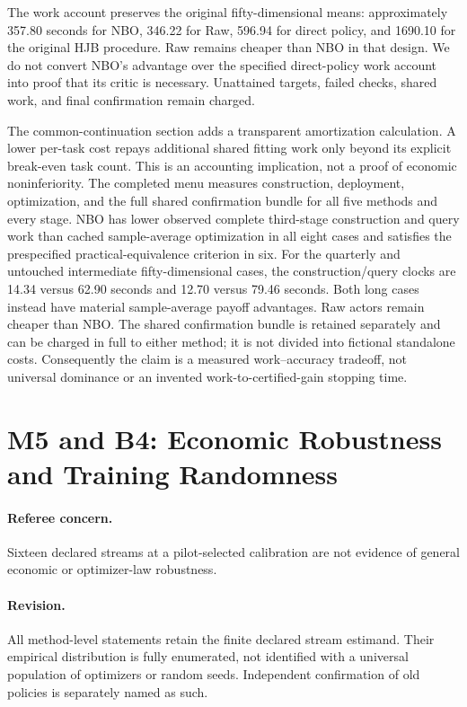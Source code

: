 The work account preserves the original fifty-dimensional means: approximately 357.80 seconds for NBO, 346.22 for Raw, 596.94 for direct policy, and 1690.10 for the original HJB procedure. Raw remains cheaper than NBO in that design. We do not convert NBO's advantage over the specified direct-policy work account into proof that its critic is necessary. Unattained targets, failed checks, shared work, and final confirmation remain charged.

The common-continuation section adds a transparent amortization calculation. A lower per-task cost repays additional shared fitting work only beyond its explicit break-even task count. This is an accounting implication, not a proof of economic noninferiority. The completed menu measures construction, deployment, optimization, and the full shared confirmation bundle for all five methods and every stage. NBO has lower observed complete third-stage construction and query work than cached sample-average optimization in all eight cases and satisfies the prespecified practical-equivalence criterion in six. For the quarterly and untouched intermediate fifty-dimensional cases, the construction/query clocks are 14.34 versus 62.90 seconds and 12.70 versus 79.46 seconds. Both long cases instead have material sample-average payoff advantages. Raw actors remain cheaper than NBO. The shared confirmation bundle is retained separately and can be charged in full to either method; it is not divided into fictional standalone costs. Consequently the claim is a measured work--accuracy tradeoff, not universal dominance or an invented work-to-certified-gain stopping time.

\section{M5 and B4: Economic Robustness and Training Randomness}
\paragraph*{Referee concern.} Sixteen declared streams at a pilot-selected calibration are not evidence of general economic or optimizer-law robustness.

\paragraph*{Revision.} All method-level statements retain the finite declared stream estimand. Their empirical distribution is fully enumerated, not identified with a universal population of optimizers or random seeds. Independent confirmation of old policies is separately named as such.

